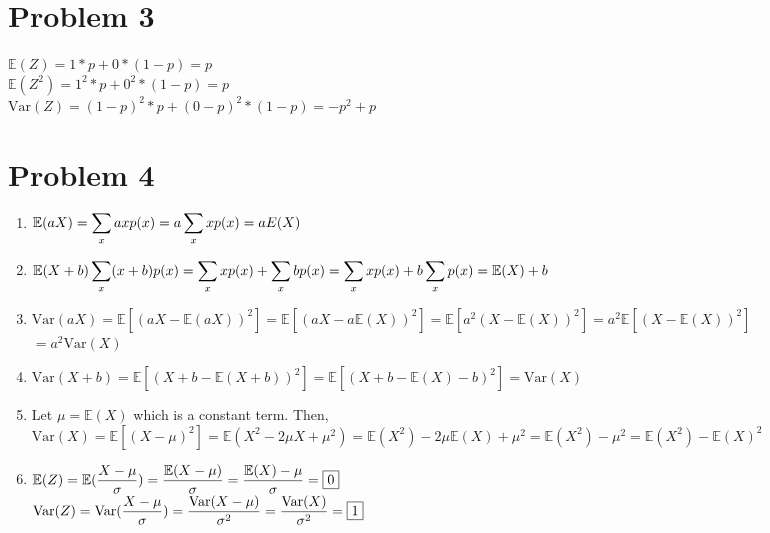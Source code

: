 \documentclass{article}
\begin{document}
\section*{Problem 3}
$\mathbb{E}(Z)=1*p+0*(1-p)=\boxed{p}$\\
$\mathbb{E}(Z^2)=1^2*p+0^2*(1-p)=\boxed{p}$\\
$\text{Var}(Z)=(1-p)^2*p+(0-p)^2*(1-p)=\boxed{-p^2+p}$

\section*{Problem 4}
\begin{enumerate}
	\item $\mathlarger{\mathbb{E}(aX)=\sum_x axp(x)=a\sum_x xp(x)=aE(X)}$
	\item $\mathlarger{\mathbb{E}(X+b)\sum_x (x+b)p(x)=\sum_x xp(x)+\sum_x bp(x)=\sum_x xp(x)+b\sum_x p(x)=\mathbb{E}(X)+b}$
	\item $\text{Var}(aX)=\mathbb{E}[(aX-\mathbb{E}(aX))^2]=\mathbb{E}[(aX-a\mathbb{E}(X))^2]=\mathbb{E}[a^2(X-\mathbb{E}(X))^2]=a^2\mathbb{E}[(X-\mathbb{E}(X))^2]$\\$=a^2\text{Var}(X)$
	\item $\text{Var}(X+b)=\mathbb{E}[(X+b-\mathbb{E}(X+b))^2]=\mathbb{E}[(X+b-\mathbb{E}(X)-b)^2]=\text{Var}(X)$
	\item Let $\mu=\mathbb{E}(X)$ which is a constant term. Then, $\text{Var}(X)=\mathbb{E}[(X-\mu)^2]=\mathbb{E}(X^2-2\mu X+\mu^2)=\mathbb{E}(X^2)-2\mu \mathbb{E}(X)+\mu^2=\mathbb{E}(X^2)-\mu^2=\mathbb{E}(X^2)-\mathbb{E}(X)^2$
	\item $\mathlarger{\mathbb{E}(Z)=\mathbb{E}(\frac{X-\mu}{\sigma})=\frac{\mathbb{E}(X-\mu)}{\sigma}=\frac{\mathbb{E}(X)-\mu}{\sigma}=\boxed{0}}$\\$\mathlarger{\text{Var}(Z)=\text{Var}(\frac{X-\mu}{\sigma})=\frac{\text{Var}(X-\mu)}{\sigma^2}=\frac{\text{Var}(X)}{\sigma^2}}=\boxed{1}$
\end{enumerate}
\end{document}

